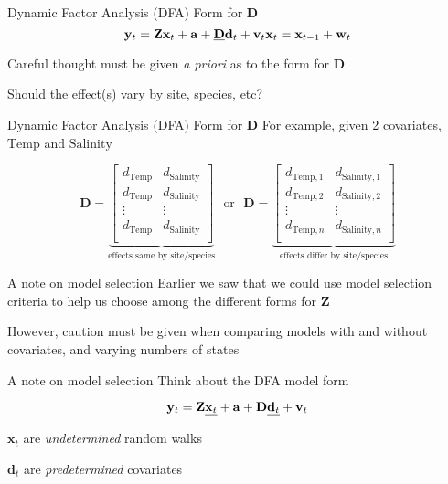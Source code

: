 \documentclass[
  ignorenonframetext,
]{beamer}
\begin{document}
\begin{frame}{Dynamic Factor Analysis (DFA) \textbar{} Form for
\(\mathbf{D}\)}
\protect\hypertarget{dynamic-factor-analysis-dfa-form-for-mathbfd}{}
\[
\mathbf{y}_t = \mathbf{Z} \mathbf{x}_t + \mathbf{a} + \underline{\mathbf{D}} \mathbf{d}_t + \mathbf{v}_t \\
\mathbf{x}_t = \mathbf{x}_{t-1} + \mathbf{w}_t
\]

Careful thought must be given \emph{a priori} as to the form for
\(\mathbf{D}\)

Should the effect(s) vary by site, species, etc?
\end{frame}

\begin{frame}{Dynamic Factor Analysis (DFA) \textbar{} Form for
\(\mathbf{D}\)}
\protect\hypertarget{dynamic-factor-analysis-dfa-form-for-mathbfd-1}{}
For example, given 2 covariates, \(\text{Temp}\) and \(\text{Salinity}\)

\[
\mathbf{D} =
\underbrace{
\begin{bmatrix}
 d_{\text{Temp}} & d_{\text{Salinity}} \\
 d_{\text{Temp}} & d_{\text{Salinity}} \\
 \vdots & \vdots \\
 d_{\text{Temp}} & d_{\text{Salinity}} \\
\end{bmatrix}
}_{\text{effects same by site/species}}
~~~ \text{or} ~~~
\mathbf{D} =
\underbrace{
\begin{bmatrix}
 d_{\text{Temp}, 1} & d_{\text{Salinity}, 1} \\
 d_{\text{Temp}, 2} & d_{\text{Salinity}, 2} \\
 \vdots & \vdots \\
 d_{\text{Temp}, n} & d_{\text{Salinity}, n} \\
\end{bmatrix}
}_{\text{effects differ by site/species}}
\]
\end{frame}

\begin{frame}{A note on model selection}
\protect\hypertarget{a-note-on-model-selection}{}
Earlier we saw that we could use model selection criteria to help us
choose among the different forms for \(\mathbf{Z}\)

However, caution must be given when comparing models with and without
covariates, and varying numbers of states
\end{frame}

\begin{frame}{A note on model selection}
\protect\hypertarget{a-note-on-model-selection-1}{}
Think about the DFA model form

\[
\mathbf{y}_t = \mathbf{Z} \underline{\mathbf{x}_t} + \mathbf{a} + \mathbf{D} \underline{\mathbf{d}_t} + \mathbf{v}_t \\
\]

\(\mathbf{x}_t\) are \emph{undetermined} random walks

\(\mathbf{d}_t\) are \emph{predetermined} covariates
\end{frame}
\end{document}
